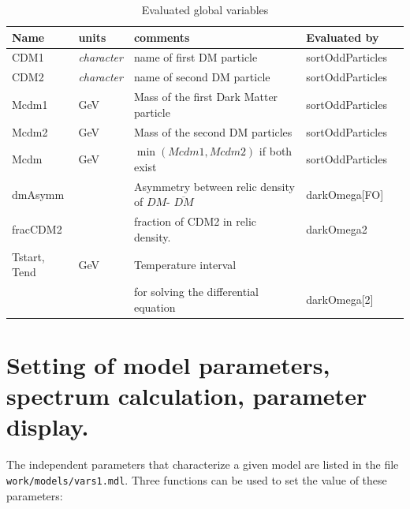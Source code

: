 \documentclass[12pt,a4paper]{article}
\begin{document}
\begin{table}[htbp]
 \caption{Evaluated global  variables}
 \label{paramTabEval}
\begin{center}
\begin{tabular}{|l|l|l|l|l|}
\hline
  Name      & units          & comments                                       & Evaluated by      \\  \hline
  CDM1      &{\it character} & name of first DM particle                 & sortOddParticles  \\     
  CDM2      &{\it character} &  name of second  DM particle             & sortOddParticles  \\
  Mcdm1     &  GeV           & Mass of the first Dark Matter particle         & sortOddParticles  \\ 
  Mcdm2     &  GeV           & Mass of the second DM particles                & sortOddParticles  \\
  Mcdm      &  GeV           & $\min(Mcdm1,Mcdm2)$ if both exist              & sortOddParticles  \\
  dmAsymm   &                & Asymmetry between relic density of ${DM}$- $\overline{DM}$ & darkOmega[FO]\\
  fracCDM2  &                & fraction of CDM2 in relic density.             & darkOmega2\\
  Tstart, Tend &   GeV       & Temperature interval& \\
&&   for solving the differential equation     &  darkOmega[2]\\  
\hline
\end{tabular}
\end{center}
\end{table}



\section{Setting of model parameters, spectrum calculation, parameter display.}
\label{setting_parameters}
The independent parameters that characterize a given model are listed in 
the file \\
\noindent
\verb|work/models/vars1.mdl|. Three functions can be used to set the
value of these parameters:\\
\end{document}
